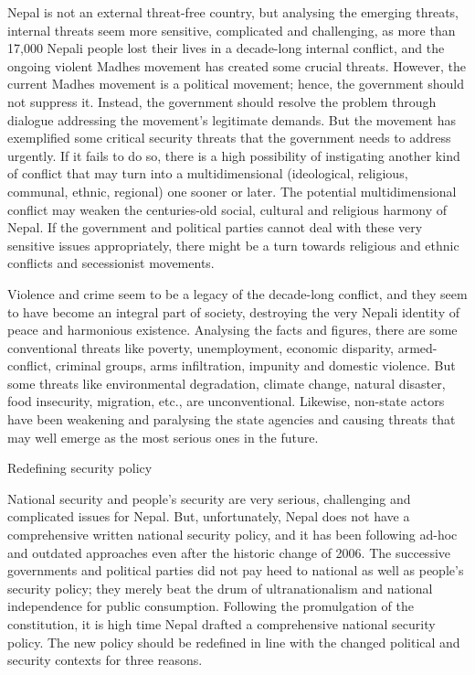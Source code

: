 \documentclass[
  openany]{book}
\begin{document}
Nepal is not an external threat-free country, but analysing the emerging threats, internal threats seem more sensitive, complicated and challenging, as more than 17,000 Nepali people lost their lives in a decade-long internal conflict, and the ongoing violent Madhes movement has created some crucial threats. However, the current Madhes movement is a political movement; hence, the government should not suppress it. Instead, the government should resolve the problem through dialogue addressing the movement's legitimate demands. But the movement has exemplified some critical security threats that the government needs to address urgently. If it fails to do so, there is a high possibility of instigating another kind of conflict that may turn into a multidimensional (ideological, religious, communal, ethnic, regional) one sooner or later. The potential multidimensional conflict may weaken the centuries-old social, cultural and religious harmony of Nepal. If the government and political parties cannot deal with these very sensitive issues appropriately, there might be a turn towards religious and ethnic conflicts and secessionist movements.

Violence and crime seem to be a legacy of the decade-long conflict, and they seem to have become an integral part of society, destroying the very Nepali identity of peace and harmonious existence. Analysing the facts and figures, there are some conventional threats like poverty, unemployment, economic disparity, armed-conflict, criminal groups, arms infiltration, impunity and domestic violence. But some threats like environmental degradation, climate change, natural disaster, food insecurity, migration, etc., are unconventional. Likewise, non-state actors have been weakening and paralysing the state agencies and causing threats that may well emerge as the most serious ones in the future.

Redefining security policy

National security and people's security are very serious, challenging and complicated issues for Nepal. But, unfortunately, Nepal does not have a comprehensive written national security policy, and it has been following ad-hoc and outdated approaches even after the historic change of 2006. The successive governments and political parties did not pay heed to national as well as people's security policy; they merely beat the drum of ultranationalism and national independence for public consumption. Following the promulgation of the constitution, it is high time Nepal drafted a comprehensive national security policy. The new policy should be redefined in line with the changed political and security contexts for three reasons.
\end{document}

